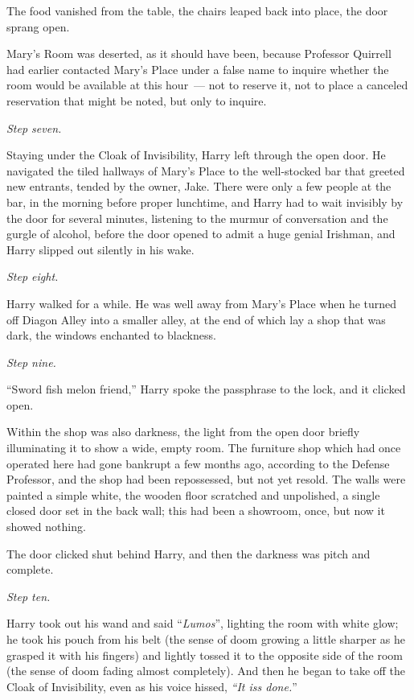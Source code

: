The food vanished from the table, the chairs leaped back into place, the door sprang open.

Mary's Room was deserted, as it should have been, because Professor Quirrell had earlier contacted Mary's Place under a false name to inquire whether the room would be available at this hour~--- not to reserve it, not to place a canceled reservation that might be noted, but only to inquire.

\emph{Step seven.}

Staying under the Cloak of Invisibility, Harry left through the open door. He navigated the tiled hallways of Mary's Place to the well-stocked bar that greeted new entrants, tended by the owner, Jake. There were only a few people at the bar, in the morning before proper lunchtime, and Harry had to wait invisibly by the door for several minutes, listening to the murmur of conversation and the gurgle of alcohol, before the door opened to admit a huge genial Irishman, and Harry slipped out silently in his wake.

\emph{Step eight.}

Harry walked for a while. He was well away from Mary's Place when he turned off Diagon Alley into a smaller alley, at the end of which lay a shop that was dark, the windows enchanted to blackness.

\emph{Step nine.}

``Sword fish melon friend,'' Harry spoke the passphrase to the lock, and it clicked open.

Within the shop was also darkness, the light from the open door briefly illuminating it to show a wide, empty room. The furniture shop which had once operated here had gone bankrupt a few months ago, according to the Defense Professor, and the shop had been repossessed, but not yet resold. The walls were painted a simple white, the wooden floor scratched and unpolished, a single closed door set in the back wall; this had been a showroom, once, but now it showed nothing.

The door clicked shut behind Harry, and then the darkness was pitch and complete.

\emph{Step ten.}

Harry took out his wand and said ``\emph{Lumos}'', lighting the room with white glow; he took his pouch from his belt (the sense of doom growing a little sharper as he grasped it with his fingers) and lightly tossed it to the opposite side of the room (the sense of doom fading almost completely). And then he began to take off the Cloak of Invisibility, even as his voice hissed, \emph{``It iss done.}''

